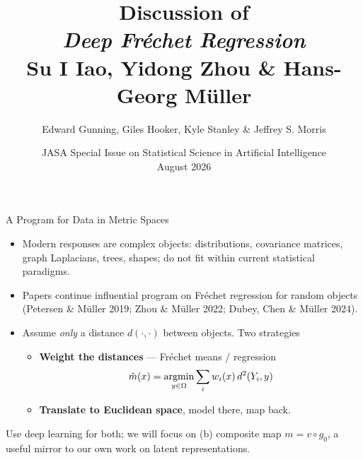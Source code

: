 \documentclass[compress]{beamer}
\newcommand{\argmin}{\ensuremath{\operatornamewithlimits{argmin}}}
\newcommand{\Frechet}{Fr\'echet}
\begin{document}
\begin{frame}

\title{Discussion of \\ \emph{Deep \Frechet{} Regression} \\ \vspace{0.15cm} {\small Su I Iao, Yidong Zhou \& Hans-Georg M\"uller}}

\author{Edward Gunning, Giles Hooker, Kyle Stanley \& Jeffrey S. Morris}

\date{JASA Special Issue on Statistical Science in Artificial Intelligence \\ \vspace{0.1cm} {\small August 2026}}

\maketitle

\end{frame}


\begin{frame}{A Program for Data in Metric Spaces}

\begin{itemize}
\item Modern responses are complex objects: distributions, covariance matrices, graph Laplacians, trees, shapes; do not fit within current statistical paradigms. 

\item Papers continue influential program on \Frechet{} regression for random objects (Petersen \& M\"uller 2019; Zhou \& M\"uller 2022; Dubey, Chen \& M\"uller 2024).

\item Assume {\em only} a distance $d(\cdot,\cdot)$ between objects. Two strategies
\begin{itemize}
\item[(a)] {\bf Weight the distances} --- \Frechet{} means / regression
\[
\hat{m}(x) = \argmin_{y \in \Omega} \sum_i w_i(x)\, d^2(Y_i,y)
\]

\item[(b)] {\bf Translate to Euclidean space}, model there, map back.
\end{itemize}
\end{itemize}

Use deep learning for both; we will focus on (b) composite map $m = v \circ g_0$, a useful mirror to our own work on latent representations.

\end{frame}
\end{document}

